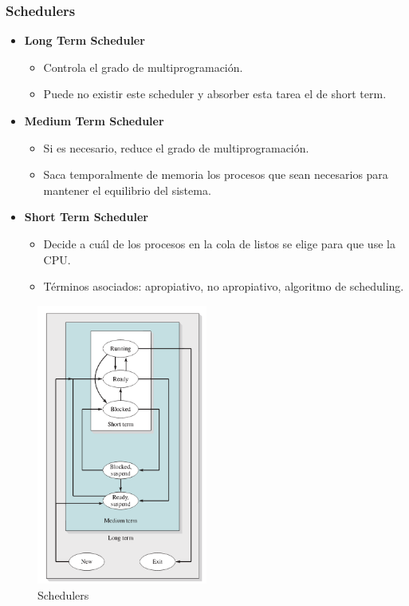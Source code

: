 \subsubsection{Schedulers}
\begin{itemize}
    \item \textbf{Long Term Scheduler}
        \begin{itemize}
            \item Controla el grado de multiprogramación.
            \item Puede no existir este scheduler y absorber esta tarea el de short term.
        \end{itemize}
    \item \textbf{Medium Term Scheduler}
        \begin{itemize}
    \item Si es necesario, reduce el grado de multiprogramación.
    \item Saca temporalmente de memoria los procesos que sean necesarios para mantener el equilibrio del sistema.
\end{itemize}
\item \textbf{Short Term Scheduler}
\begin{itemize}
    \item Decide a cuál de los procesos en la cola de listos se elige para que use la CPU.
    \item Términos asociados: apropiativo, no apropiativo, algoritmo de scheduling.
\end{itemize}
\end{itemize}

\begin{figure}[ht]
    \begin{center}
        \includegraphics[width=0.50\textwidth]{assets/Schedulers2.pdf}
    \end{center}
    \caption{Schedulers}\label{fig:5}
\end{figure}

